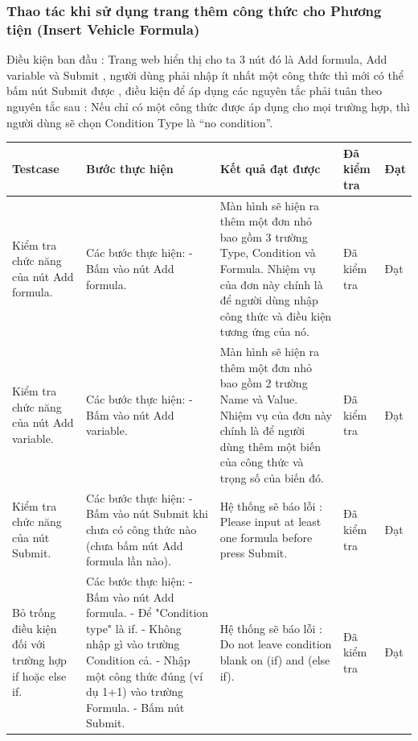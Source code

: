 \documentclass{article}
\begin{document}
\subsubsection{Thao tác khi sử dụng trang thêm công thức cho Phương tiện (Insert Vehicle Formula) }
Điều kiện ban đầu : Trang web hiển thị cho ta 3 nút đó là Add formula, Add variable và Submit , người dùng phải nhập ít nhất một công thức thì mới có thể bấm nút Submit được , điều kiện để áp dụng các nguyên tắc phải tuân theo nguyên tắc sau : Nếu chỉ có một công thức được áp dụng cho mọi trường hợp, thì người dùng sẽ chọn Condition Type là “no condition”.  \newline
\begin{longtable}{ | p{} |p{} | p{}  | p{}  | p{}  | } 
\hline
\textbf{Testcase}& \textbf{Bước thực hiện}& \textbf{Kết quả đạt được} & \textbf{Đã kiểm tra}& \textbf{Đạt} \\ 
\hline
\hline
Kiểm tra chức năng của nút Add formula. &
Các bước thực hiện: \newline
- Bấm vào nút Add formula.
&
Màn hình sẽ hiện ra thêm một đơn nhỏ bao gồm 3 trường Type, Condition và Formula. Nhiệm vụ của đơn này chính là để người dùng nhập công thức và điều kiện tương ứng của nó. &
Đã kiểm tra &
Đạt \\

\hline
Kiểm tra chức năng của nút Add variable. &
Các bước thực hiện: \newline
- Bấm vào nút Add variable.
&
Màn hình sẽ hiện ra thêm một đơn nhỏ bao gồm 2 trường Name và Value. Nhiệm vụ của đơn này chính là để người dùng thêm một biến của công thức và trọng số của biến đó. &
Đã kiểm tra &
Đạt \\

\hline
Kiểm tra chức năng của nút Submit. &
Các bước thực hiện: \newline
- Bấm vào nút Submit khi chưa có công thức nào (chưa bấm nút Add formula lần nào).
&
Hệ thống sẽ báo lỗi : Please input at least one formula before press Submit.
&
Đã kiểm tra &
Đạt \\

\hline
Bỏ trống điều kiện đối với trường hợp if hoặc else if. &
Các bước thực hiện: \newline
- Bấm vào nút Add formula. \newline
- Để "Condition type" là if. \newline
- Không nhập gì vào trường Condition cả. \newline
- Nhập một công thức đúng (ví dụ 1+1) vào trường Formula. \newline
- Bấm nút Submit.  
&
Hệ thống sẽ báo lỗi : Do not leave condition blank on (if) and (else if).
&
Đã kiểm tra &
Đạt \\


\end{longtable}
\end{document}
